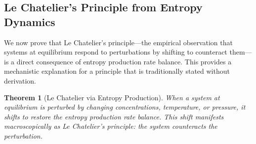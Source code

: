 \documentclass[12pt,a4paper]{article}
\newtheorem{theorem}{Theorem}[section]
\theoremstyle{definition}
\theoremstyle{remark}
\begin{document}
\subsection{Le Chatelier's Principle from Entropy Dynamics}

We now prove that Le Chatelier's principle—the empirical observation that systems at equilibrium respond to perturbations by shifting to counteract them—is a direct consequence of entropy production rate balance. This provides a mechanistic explanation for a principle that is traditionally stated without derivation.

\begin{theorem}[Le Chatelier via Entropy Production]
\label{thm:lechatelier}
When a system at equilibrium is perturbed by changing concentrations, temperature, or pressure, it shifts to restore the entropy production rate balance. This shift manifests macroscopically as Le Chatelier's principle: the system counteracts the perturbation.
\end{theorem}
\end{document}
